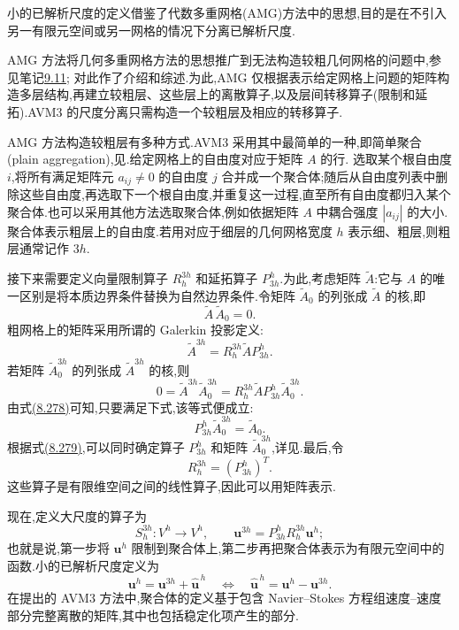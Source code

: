\begin{note}[小的已解析尺度的定义]
\label{note:vms-avm-small-scale-definition}
小的已解析尺度的定义借鉴了代数多重网格(AMG)方法中的思想,目的是在不引入另一有限元空间或另一网格的情况下分离已解析尺度.

AMG 方法将几何多重网格方法的思想推广到无法构造较粗几何网格的问题中,参见笔记\hyperref[note:multigrid-method]{9.11};\textcite{Stueben2001} 对此作了介绍和综述.为此,AMG 仅根据表示给定网格上问题的矩阵构造多层结构,再建立较粗层、这些层上的离散算子,以及层间转移算子(限制和延拓).AVM3 的尺度分离只需构造一个较粗层及相应的转移算子.

AMG 方法构造较粗层有多种方式.AVM3 采用其中最简单的一种,即简单聚合(plain aggregation),见\textcite{VanekMandelBrezina1996}.给定网格上的自由度对应于矩阵 $A$ 的行.\textcite{GravemeierGeeWall2009,GravemeierGeeKronbichlerWall2010} 选取某个根自由度 $i$,将所有满足矩阵元 $a_{ij}\ne0$ 的自由度 $j$ 合并成一个聚合体;随后从自由度列表中删除这些自由度,再选取下一个根自由度,并重复这一过程,直至所有自由度都归入某个聚合体.也可以采用其他方法选取聚合体,例如依据矩阵 $A$ 中耦合强度 $|a_{ij}|$ 的大小.聚合体表示粗层上的自由度.若用对应于细层的几何网格宽度 $h$ 表示细、粗层,则粗层通常记作 $3h$.

接下来需要定义向量限制算子 $R_h^{3h}$ 和延拓算子 $P_{3h}^h$.为此,考虑矩阵 $\widetilde A$:它与 $A$ 的唯一区别是将本质边界条件替换为自然边界条件.令矩阵 $\widetilde A_0$ 的列张成 $\widetilde A$ 的核,即
\begin{equation}\label{eq:vms-avm-kernel-fine-grid}
 \widetilde A\,\widetilde A_0=0.
\end{equation}
粗网格上的矩阵采用所谓的 Galerkin 投影定义:
\[
 \widetilde A^{3h}=R_h^{3h}\widetilde A P_{3h}^h.
\]
若矩阵 $\widetilde A_0^{3h}$ 的列张成 $\widetilde A^{3h}$ 的核,则
\[
 0=\widetilde A^{3h}\widetilde A_0^{3h}
  =R_h^{3h}\widetilde A P_{3h}^h\widetilde A_0^{3h}.
\]
由式\hyperref[eq:vms-avm-kernel-fine-grid]{(8.278)}可知,只要满足下式,该等式便成立:
\begin{equation}\label{eq:vms-avm-kernel-transfer}
 P_{3h}^h\widetilde A_0^{3h}=\widetilde A_0.
\end{equation}
根据式\hyperref[eq:vms-avm-kernel-transfer]{(8.279)},可以同时确定算子 $P_{3h}^h$ 和矩阵 $\widetilde A_0^{3h}$,详见\textcite{GravemeierGeeWall2009}.最后,令
\[
 R_h^{3h}=(P_{3h}^h)^T.
\]
这些算子是有限维空间之间的线性算子,因此可以用矩阵表示.

现在,定义大尺度的算子为
\[
 S_h^{3h}:V^h\to V^h,\qquad
 \bm u^{3h}=P_{3h}^hR_h^{3h}\bm u^h;
\]
也就是说,第一步将 $\bm u^h$ 限制到聚合体上,第二步再把聚合体表示为有限元空间中的函数.小的已解析尺度定义为
\begin{equation}\label{eq:vms-avm-scale-decomposition}
 \bm u^h=\bm u^{3h}+\widehat{\bm u}^{\,h}
 \quad\Longleftrightarrow\quad
 \widehat{\bm u}^{\,h}=\bm u^h-\bm u^{3h}.
\end{equation}
在\textcite{GravemeierGeeKronbichlerWall2010}提出的 AVM3 方法中,聚合体的定义基于包含 Navier--Stokes 方程组速度--速度部分完整离散的矩阵,其中也包括稳定化项产生的部分.
\end{note}

